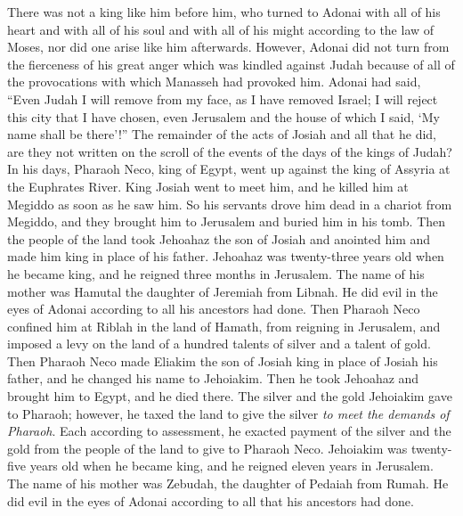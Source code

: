 \begin{biblechapter}
\verse There was not a king like him before him, who turned to Adonai with all of his heart and with all of his soul and with all of his might according to the law of Moses, nor did one arise like him afterwards.
\verse However, Adonai did not turn from the fierceness of his great anger which was kindled against Judah because of all of the provocations with which Manasseh had provoked him.
\verse Adonai had said, “Even Judah I will remove from my face, as I have removed Israel; I will reject this city that I have chosen, even Jerusalem and the house of which I said, ‘My name shall be there’!”
\verse The remainder of the acts of Josiah and all that he did, are they not written on the scroll of the events of the days of the kings of Judah?
\verse In his days, Pharaoh Neco, king of Egypt, went up against the king of Assyria at the Euphrates River. King Josiah went to meet him, and he killed him at Megiddo as soon as he saw him.
\verse So his servants drove him dead in a chariot from Megiddo, and they brought him to Jerusalem and buried him in his tomb. Then the people of the land took Jehoahaz the son of Josiah and anointed him and made him king in place of his father.
 Jehoahaz was twenty-three years old when he became king, and he reigned three months in Jerusalem. The name of his mother was Hamutal the daughter of Jeremiah from Libnah.
\verse He did evil in the eyes of Adonai according to all his ancestors had done.
\verse Then Pharaoh Neco confined him at Riblah in the land of Hamath, from reigning in Jerusalem, and imposed a levy on the land of a hundred talents of silver and a talent of gold.
 Then Pharaoh Neco made Eliakim the son of Josiah king in place of Josiah his father, and he changed his name to Jehoiakim. Then he took Jehoahaz and brought him to Egypt, and he died there.
\verse The silver and the gold Jehoiakim gave to Pharaoh; however, he taxed the land to give the silver \textit{to meet the demands of Pharaoh}. Each according to assessment, he exacted payment of the silver and the gold from the people of the land to give to Pharaoh Neco.
\verse Jehoiakim was twenty-five years old when he became king, and he reigned eleven years in Jerusalem. The name of his mother was Zebudah, the daughter of Pedaiah from Rumah.
\verse He did evil in the eyes of Adonai according to all that his ancestors had done.
\end{biblechapter}

